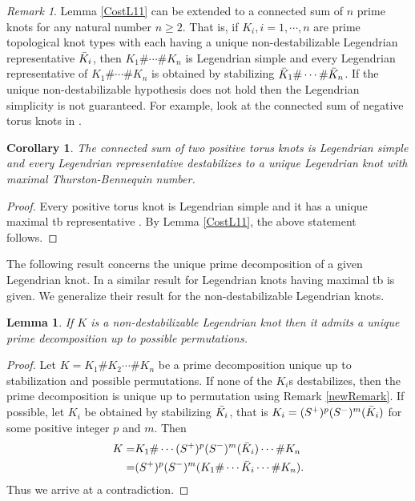 \documentclass[11pt]{amsart}
\numberwithin{equation}{section}
\theoremstyle{plain}
\newtheorem{Lemma}[equation]{Lemma}
\newtheorem{corollary}[equation]{Corollary}
\theoremstyle{definition}
\theoremstyle{remark} \newtheorem{remark}[equation]{Remark}
\theoremstyle{remark} \newtheorem{observation}[equation]{Observation}
\begin{document}
\begin{remark}\label{Re2}
 Lemma \ref{CostL11} can be extended to a connected sum of $n$ prime knots for any
natural number $n\geq 2$. That is, if $K_i, i = 1,\cdots, n$ are prime topological knot types with each having a unique non-destabilizable Legendrian representative $\Bar{K}_i$, then $K_1\#\cdots\#K_n$ is Legendrian simple and every Legendrian
representative of $K_1\#\cdots\#K_n$ is obtained by stabilizing $\Bar{K}_1\#\cdots \#\Bar{K}_n$. If the unique non-destabilizable hypothesis does not hold then the Legendrian simplicity is not guaranteed. For example, look at the connected sum of negative torus knots in \cite{EH}.
\end{remark}
\begin{corollary}
     The connected sum of two positive torus knots is Legendrian simple and every Legendrian representative destabilizes to a unique Legendrian knot with maximal Thurston-Bennequin number.
\end{corollary}
\begin{proof}
    Every positive torus knot is Legendrian simple and it has a unique maximal tb representative \cite{EH}. By Lemma \ref{CostL11}, the above statement follows. 
\end{proof}
The following result concerns the unique prime decomposition of a given Legendrian knot. In \cite{EH} a similar result for Legendrian knots having maximal tb is given. We generalize their result for the non-destabilizable Legendrian knots.
\begin{Lemma}\label{CostL12}
   If $K$ is a non-destabilizable Legendrian knot then it admits a unique prime decomposition up to possible permutations.
\end{Lemma}

\begin{proof}
    Let $K=K_1\#K_2\cdots \#K_n$ be a prime decomposition unique up to stabilization and possible permutations. If none of the $K_i$s destabilizes, then the prime decomposition is unique up to permutation using Remark \ref{newRemark}. If possible, let $K_i$ be obtained by stabilizing $\Bar{K_i}$, that is $K_i=(S^+)^p(S^-)^m(\Bar{K}_i)$ for some positive integer $p$ and $m$. Then 
    \begin{align*}
        K=&K_1\#\cdots (S^+)^p(S^-)^m(\Bar{K}_i) \cdots\# K_n\\
        =&(S^+)^p(S^-)^m(K_1\#\cdots \Bar{K}_i\cdots \#K_n).
    \end{align*}
    Thus we arrive at a contradiction.
\end{proof}
\end{document}
